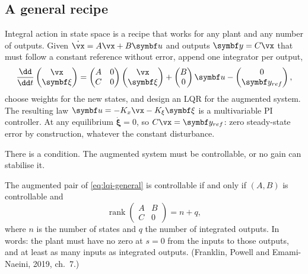 \subsection{A general recipe}
Integral action in state space is a recipe that works for any plant and any number of outputs. Given $\dot{\vx} = A\vx + B\symbf u$ and outputs $\symbf y = C\vx$ that must follow a constant reference without error, append one integrator per output,
\begin{equation}\label{eq:lqi-general}
  \frac{\dd}{\dd t}\begin{pmatrix}\vx\\ \symbf\xi\end{pmatrix} = \begin{pmatrix} A & 0\\ C & 0\end{pmatrix}\begin{pmatrix}\vx\\ \symbf\xi\end{pmatrix} + \begin{pmatrix} B\\ 0\end{pmatrix}\symbf u - \begin{pmatrix} 0\\ \symbf y_{ref}\end{pmatrix},
\end{equation}
choose weights for the new states, and design an LQR for the augmented system. The resulting law $\symbf u = -K_x\vx - K_\xi\symbf\xi$ is a multivariable PI controller. At any equilibrium $\dot{\symbf\xi} = 0$, so $C\vx = \symbf y_{ref}$: zero steady-state error by construction, whatever the constant disturbance.

There is a condition. The augmented system must be controllable, or no gain can stabilise it.

\begin{theorem}
\label{thm:lqi-rank}
The augmented pair of \cref{eq:lqi-general} is controllable if and only if $(A, B)$ is controllable and
\begin{equation*}
  \operatorname{rank}\begin{pmatrix} A & B\\ C & 0\end{pmatrix} = n + q ,
\end{equation*}
where $n$ is the number of states and $q$ the number of integrated outputs. In words: the plant must have no zero at $s = 0$ from the inputs to those outputs, and at least as many inputs as integrated outputs. (Franklin, Powell and Emami-Naeini, 2019, ch.~7.)
\end{theorem}

